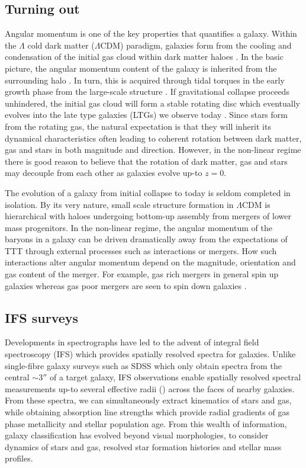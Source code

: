 \subsection{Turning out}
Angular momentum is one of the key properties that quantifies a galaxy. Within the $\Lambda$ cold dark matter ($\Lambda$CDM) paradigm, galaxies form from the cooling and condensation of the initial gas cloud within dark matter haloes \citep{white1978, mo1998}. In the basic picture, the angular momentum content of the galaxy is inherited from the surrounding halo \citep[][]{fall1980}. In turn, this is acquired through tidal torques in the early growth phase from the large-scale structure \citep[e.g.][]{peebles1969, Doroshkevich1970}. If gravitational collapse proceeds unhindered, the initial gas cloud will form a stable rotating disc which eventually evolves into the late type galaxies (LTGs) we observe today \citep{white1978}. Since stars form from the rotating gas, the natural expectation is that they will inherit its dynamical characteristics often leading to coherent rotation between dark matter, gas and stars in both magnitude and direction. However, in the non-linear regime there is good reason to believe that the rotation of dark matter, gas and stars may decouple from each other as galaxies evolve up-to $z=0$. 

The evolution of a galaxy from initial collapse to today is seldom completed in isolation. By its very nature, small scale structure formation in $\Lambda$CDM is hierarchical with haloes undergoing bottom-up assembly from mergers of lower mass progenitors. In the non-linear regime, the angular momentum of the baryons in a galaxy can be driven dramatically away from the expectations of TTT through external processes such as interactions or mergers. How such interactions alter angular momentum depend on the magnitude, orientation and gas content of the merger. For example, gas rich mergers in general spin up galaxies whereas gas poor mergers are seen to spin down galaxies \citep[][]{lagos2017,lagos2018}.

\subsection{IFS surveys}
Developments in spectrographs have led to the advent of integral field spectroscopy (IFS) which provides spatially resolved spectra for galaxies. Unlike single-fibre galaxy surveys such as SDSS which only obtain spectra from the central $\sim 3 ''$ of a target galaxy, IFS observations enable spatially resolved spectral measurements up-to several effective radii (\re) across the faces of nearby galaxies. From these spectra, we can simultaneously extract kinematics of stars and gas, while obtaining absorption line strengths which provide radial gradients of gas phase metallicity and stellar population age. From this wealth of information, galaxy classification has evolved beyond visual morphologies, to consider dynamics of stars and gas, resolved star formation histories and stellar mass profiles. 

